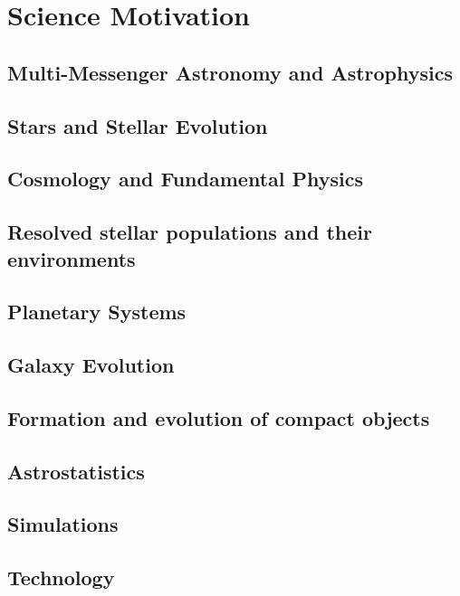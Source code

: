 \section{Science Motivation }
\label{sec:science}

\subsection{Multi-Messenger Astronomy and Astrophysics}


\subsection{Stars and Stellar Evolution}

\subsection{Cosmology and Fundamental Physics}

\subsection{Resolved stellar populations and their environments}

\subsection{Planetary Systems}

\subsection{Galaxy Evolution}

\subsection{Formation and evolution of compact objects}

\subsection{Astrostatistics}

\subsection{Simulations}

\subsection{Technology}
